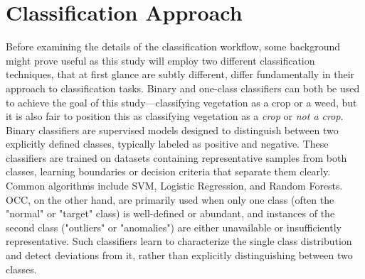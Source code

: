 \documentclass[letterpaper, notitlepage]{report}
\begin{document}
\section{Classification Approach}
%
Before examining the details of the classification workflow, some background might prove useful as this study will employ two different classification techniques, that at first glance are subtly different,  differ fundamentally in their approach to classification tasks. Binary and one-class classifiers can both be used to achieve the goal of this study---classifying vegetation as a crop or a weed, but it is also fair to position this as classifying vegetation as a \textit{crop} or \textit{not a crop}. Binary classifiers are supervised models designed to distinguish between two explicitly defined classes, typically labeled as positive and negative. These classifiers are trained on datasets containing representative samples from both classes, learning boundaries or decision criteria that separate them clearly. Common algorithms include \gls{SVM}, Logistic Regression, and Random Forests. \gls{OCC}, on the other hand, are primarily used when only one class (often the "normal" or "target" class) is well-defined or abundant, and instances of the second class ("outliers" or "anomalies") are either unavailable or insufficiently representative. Such classifiers learn to characterize the single class distribution and detect deviations from it, rather than explicitly distinguishing between two classes.
\end{document}
